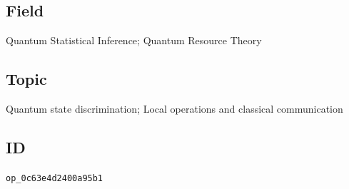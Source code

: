 \subsection*{Field}

Quantum Statistical Inference; Quantum Resource Theory

\subsection*{Topic}

Quantum state discrimination; Local operations and classical communication

\subsection*{ID}

\texttt{op\_0c63e4d2400a95b1}
